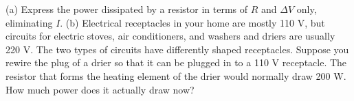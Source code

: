         (a) Express the power dissipated by a resistor in terms
        of $R$ and $\Delta V$ only, eliminating $I$.
        \answercheck\hwendpart
        (b)
        Electrical receptacles in your home are mostly 110 V, but
        circuits for electric stoves, air conditioners, and washers
        and driers are usually 220 V.  The two types of circuits
        have differently shaped receptacles.  Suppose you rewire the
        plug of a drier so that it can be plugged in to a 110 V
        receptacle.  The resistor that forms the heating element of
        the drier would normally draw 200 W.  How much power does
        it actually draw now?
        \answercheck
